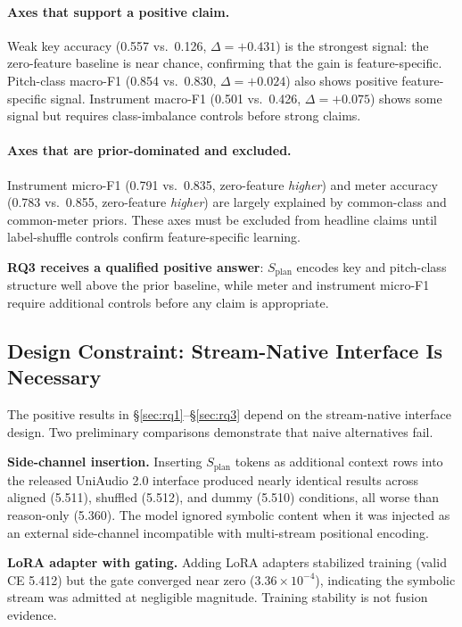 \documentclass[11pt]{article}
\newcommand{\splan}{$S_{\mathrm{plan}}$}
\begin{document}
\paragraph{Axes that support a positive claim.}
Weak key accuracy (0.557 vs.\ 0.126, $\Delta = +0.431$) is the strongest signal: the
zero-feature baseline is near chance, confirming that the gain is feature-specific.
Pitch-class macro-F1 (0.854 vs.\ 0.830, $\Delta = +0.024$) also shows positive
feature-specific signal.  Instrument macro-F1 (0.501 vs.\ 0.426, $\Delta = +0.075$)
shows some signal but requires class-imbalance controls before strong claims.

\paragraph{Axes that are prior-dominated and excluded.}
Instrument micro-F1 (0.791 vs.\ 0.835, zero-feature \emph{higher}) and meter accuracy
(0.783 vs.\ 0.855, zero-feature \emph{higher}) are largely explained by common-class
and common-meter priors.  These axes must be excluded from headline claims until
label-shuffle controls confirm feature-specific learning.

\textbf{RQ3 receives a qualified positive answer}: \splan{} encodes key and pitch-class
structure well above the prior baseline, while meter and instrument micro-F1 require
additional controls before any claim is appropriate.

\subsection{Design Constraint: Stream-Native Interface Is Necessary}
\label{sec:interface}

The positive results in \S\ref{sec:rq1}--\S\ref{sec:rq3} depend on the stream-native
interface design.  Two preliminary comparisons demonstrate that naive alternatives fail.

\textbf{Side-channel insertion.}
Inserting \splan{} tokens as additional context rows into the released UniAudio 2.0
interface produced nearly identical results across aligned (5.511), shuffled (5.512),
and dummy (5.510) conditions, all worse than reason-only (5.360).  The model ignored
symbolic content when it was injected as an external side-channel incompatible with
multi-stream positional encoding.

\textbf{LoRA adapter with gating.}
Adding LoRA adapters stabilized training (valid CE 5.412) but the gate converged near
zero ($3.36 \times 10^{-4}$), indicating the symbolic stream was admitted at negligible
magnitude.  Training stability is not fusion evidence.
\end{document}
